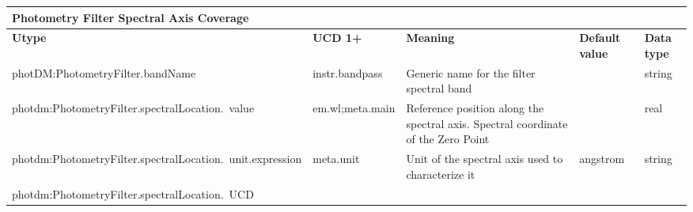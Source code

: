 \documentclass[11pt,a4paper]{ivoa}
\begin{document}
\begin{appendices}
\begin{table}[H]
\centering
\begin{adjustbox}{angle=90}
\begin{tabular}{p{2.5in}|p{1.5in}|p{2in}|p{0.74in}|p{0.35in}}
\multicolumn{5}{p{\dimexpr6.59in+8\tabcolsep\relax}}{\centering 
{\fontsize{8pt}{8pt}\selectfont \textbf{Photometry Filter Spectral Axis Coverage}}} \\
\hline
\multicolumn{1}{p{2.5in}}{{\fontsize{8pt}{8pt}\selectfont \textbf{Utype}}} &
\multicolumn{1}{p{1.5in}}{{\fontsize{8pt}{8pt}\selectfont \textbf{UCD 1+}}} &
\multicolumn{1}{p{2in}}{{\fontsize{8pt}{8pt}\selectfont \textbf{Meaning}}} &
\multicolumn{1}{p{0.74in}}{{\fontsize{8pt}{8pt}\selectfont \textbf{Default value}}} &
\multicolumn{1}{p{0.35in}}{{\fontsize{8pt}{8pt}\selectfont \textbf{Data type}}} \\
\hline
\multicolumn{1}{p{2.5in}}{{\fontsize{8pt}{8pt}\selectfont photDM:PhotometryFilter.bandName}} &
\multicolumn{1}{p{1.5in}}{{\fontsize{8pt}{8pt}\selectfont instr.bandpass }} &
\multicolumn{1}{p{2in}}{{\fontsize{8pt}{8pt}\selectfont Generic name for the 
filter spectral band}} &
\multicolumn{1}{p{0.74in}}{} &
\multicolumn{1}{p{0.35in}}{{\fontsize{8pt}{8pt}\selectfont string}} \\
\hline
\multicolumn{1}{p{2.5in}}{{\fontsize{8pt}{8pt}
\selectfont photdm:PhotometryFilter.spectralLocation.\ value}} &
\multicolumn{1}{p{1.5in}}{{\fontsize{8pt}{8pt}\selectfont em.wl;meta.main }} &
\multicolumn{1}{p{2in}}{{\fontsize{8pt}{8pt}\selectfont Reference position along the 
spectral axis. Spectral coordinate of the Zero Point }} &
\multicolumn{1}{p{0.74in}}{} &
\multicolumn{1}{p{0.35in}}{{\fontsize{8pt}{8pt}\selectfont real}} \\
\hline
\multicolumn{1}{p{2.5in}}{{\fontsize{8pt}{8pt}
\selectfont photdm:PhotometryFilter.spectralLocation.\ unit.expression}} &
\multicolumn{1}{p{1.5in}}{{\fontsize{8pt}{8pt}\selectfont meta.unit }} &
\multicolumn{1}{p{2in}}{{\fontsize{8pt}{8pt}\selectfont Unit of the spectral axis used 
to characterize it}} &
\multicolumn{1}{p{0.74in}}{{\fontsize{8pt}{8pt}\selectfont angstrom}} &
\multicolumn{1}{p{0.35in}}{{\fontsize{8pt}{8pt}\selectfont string}} \\
\hline
\multicolumn{1}{p{2.5in}}{{\fontsize{8pt}{8pt}
\selectfont photdm:PhotometryFilter.spectralLocation.\ UCD}} &

\end{tabular}
\end{adjustbox}
\end{table}
\end{appendices}
\end{document}
